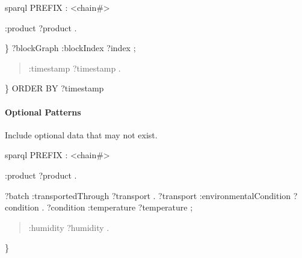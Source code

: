 \documentclass[letterpaper,10pt,english]{sphinxmanual}
\begin{document}
\sphinxAtStartPar
{}
{\color{red}\bfseries{}\textasciigrave{}\textasciigrave{}}{\color{red}\bfseries{}\textasciigrave{}}sparql
PREFIX : \textless{}\sphinxhyphen{}chain\#\textgreater{}
\begin{description}
\begin{description}
\begin{description}
\sphinxAtStartPar
:product ?product .

\end{description}

\end{description}

\sphinxAtStartPar
\}
?blockGraph :blockIndex ?index ;
\begin{quote}

\sphinxAtStartPar
:timestamp ?timestamp .
\end{quote}

\end{description}

\sphinxAtStartPar
\}
ORDER BY ?timestamp
{\color{red}\bfseries{}\textasciigrave{}\textasciigrave{}}{\color{red}\bfseries{}\textasciigrave{}}


\paragraph{Optional Patterns}
\label{\detokenize{api/sparql-api:optional-patterns}}
\sphinxAtStartPar
Include optional data that may not exist.

\sphinxAtStartPar
{}
{\color{red}\bfseries{}\textasciigrave{}\textasciigrave{}}{\color{red}\bfseries{}\textasciigrave{}}sparql
PREFIX : \textless{}\sphinxhyphen{}chain\#\textgreater{}
\begin{description}
\begin{description}
\sphinxAtStartPar
:product ?product .

\sphinxAtStartPar
?batch :transportedThrough ?transport .
?transport :environmentalCondition ?condition .
?condition :temperature ?temperature ;
\begin{quote}

\sphinxAtStartPar
:humidity ?humidity .
\end{quote}

\end{description}

\sphinxAtStartPar
\}

\end{description}
\end{document}
